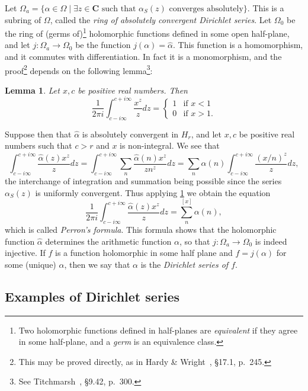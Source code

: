\documentclass[10pt]{article}
\newtheorem{lemm}[theo]{Lemma}
\theoremstyle{definition}
\def\CC{\mathbf{C}}
\def\fnfi{Two holomorphic functions defined in half-planes are \emph{equivalent} if they agree in some half-plane, and a \emph{germ} is an equivalence class.}
\def\fnsi{This may be proved directly, as in Hardy \& Wright~\cite{bib:86}, \S17.1, p.~245.}
\def\fnse{See Titchmarsh~\cite{bib:194}, \S9.42, p.~300.}
\begin{document}
Let $\Omega_a = \{ \alpha \in \Omega \mid \text{$\exists z \in \CC$ such that $\alpha_S(z)$ converges absolutely} \}$.
This is a subring of $\Omega$, called the \emph{ring of absolutely convergent Dirichlet series}.
Let $\Omega_0$ be the ring of (germs of)\footnote{\fnfi} holomorphic functions defined in some open half-plane, and let $j : \Omega_a \to \Omega_0$ be the function $j(\alpha) = \widehat\alpha$.
This function is a homomorphism, and it commutes with differentiation.
In fact it is a monomorphism, and the proof\footnote{\fnsi} depends on the following lemma\footnote{\fnse}:


\begin{lemm}
\label{1.2.1}
Let $x,c$ be positive real numbers.
Then
\[
\frac{1}{2\pi i} \int_{c - i \infty}^{c + i\infty} \frac{x^z}{z} dz
= \begin{cases}
1 & \text{if $x < 1$}
\\
0 & \text{if $x > 1$}.
\end{cases}
\]
\end{lemm}


Suppose then that $\widehat\alpha$ is absolutely convergent in $H_r$, and let $x,c$ be positive real numbers such that $c > r$ and $x$ is non-integral.
We see that
\[
\int_{c - i\infty}^{c + i\infty} \frac{\widehat\alpha(z) x^z}{z} dz
= \int_{c - i\infty}^{c + i\infty} \sum_n \frac{\widehat\alpha(n) x^z}{z n^z} dz
= \sum_n \alpha(n) \int_{c - i\infty}^{c + i\infty} \frac{(x/n)^z}{z} dz,
\]
the interchange of integration and summation being possible since the series $\alpha_S(z)$ is uniformly convergent.
Thus applying \ref{1.2.1} we obtain the equation
\[
\frac{1}{2\pi i} 
\int_{c-i\infty}^{c+i\infty} \frac{\widehat\alpha(z) x^z}{z} dz
= \sum_n^{[x]} \alpha(n),
\]
which is called \emph{Perron's formula}.
This formula shows that the holomorphic function $\widehat\alpha$ determines the arithmetic function $\alpha$, so that $j : \Omega_a \to \Omega_0$ is indeed injective.
If $f$ is a function holomorphic in some half plane and $f = j(\alpha)$ for some (unique) $\alpha$, then we say that $\alpha$ is the \emph{Dirichlet series of $f$}.


\subsection{Examples of Dirichlet series}
\label{ch:1.3}
\end{document}

